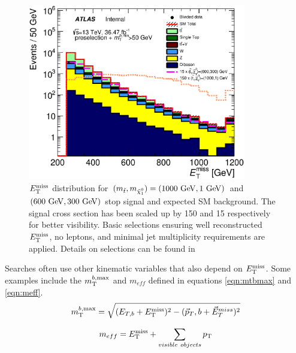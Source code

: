 \begin{figure}[h!]
\centering
    \includegraphics[width=0.85\textwidth]{figures/preselection/Met_preCutSRPlot_withRatio_log.eps}\hspace{0.05\textwidth}
\caption{ $E_{\mathrm{T}}^{\mathrm{miss}}$ distribution for $(m_{\stop}, m_{\ninoone}) = (1000 \gev,1 \gev)$ and $(600 \gev, 300 \gev)$ stop signal and expected SM background.  The signal cross section has been scaled up by 150 and 15 respectively for better visibility.  Basic selections ensuring well reconstructed $E_{\mathrm{T}}^{\mathrm{miss}}$, no leptons, and minimal jet multiplicity requirements are applied.  Details on selections can be found in \cite{stop0LCONF} }
\label{fig:presel:MET1}
\end{figure}

\indent Searches often use other kinematic variables that also depend on $E_{\mathrm{T}}^{\mathrm{miss}}$.  Some examples include the $m_{\mathrm{T}}^{b,\mathrm{max}}$ and $m_{eff}$ defined in equations \ref{eqn:mtbmax} and \ref{eqn:meff}. \\

\begin{equation}
m_{\mathrm{T}}^{b,\mathrm{max}} = \sqrt{  (E_{T,b} +E_{\mathrm{T}}^{\mathrm{miss}} )^2 - ( \vec{p}_T,b + \vec{E}_{T}^{miss} )^2 }
\label{eqn:mtbmax}
\end{equation}

\begin{equation}
m_{eff} =  E_{\mathrm{T}}^{\mathrm{miss}} + \sum_{visible~objects} p_{\mathrm{T}} 
\label{eqn:meff}
\end{equation}


